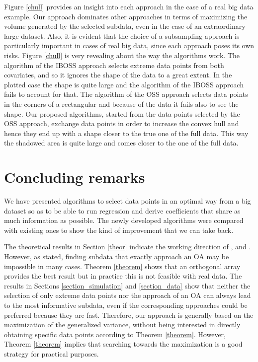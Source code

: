 \documentclass[12pt]{article}
\theoremstyle{definition}
\begin{document}
	Figure \ref{chull} provides an insight into each approach in the case of a real big data example. Our approach dominates other approaches in terms of maximizing the volume generated by the selected subdata, even in the case of an extraordinary large dataset. Also, it is evident that the choice of a subsampling approach is particularly important in cases of real big data, since each approach poses its own risks. Figure \ref{chull} is very revealing about the way the algorithms work. The algorithm of the IBOSS approach selects extreme data points from both covariates, and so it ignores the shape of the data to a great extent. In the plotted case the shape is quite large and the algorithm of the IBOSS approach fails to account for that. The algorithm of the OSS approach selects data points in the corners of a rectangular and because of the data it fails also to see the shape. Our proposed algorithms, started from the data points selected by the OSS approach, exchange data points in order to increase the convex hull and hence they end up with a shape closer to the true one of the full data. This way the shadowed area is quite large and comes closer to the one of the full data.
	
	\section{Concluding remarks}
	\label{concluding_remarks}
	We have presented algorithms to select data points in an optimal way from a big dataset so as to be able to run regression and derive coefficients that share as much information as possible. The newly developed algorithms were compared with existing ones to show the kind of improvement that we can take back. 
	
	The theoretical results in Section \ref{theor} indicate the working direction of \cite{wang2019information}, \cite{wang2021oss} and \cite{ren&zhao}. However, as \cite{wang2021oss} stated, finding subdata that exactly approach an OA may be impossible in many cases. Theorem \ref{theorem} shows that
	an orthogonal array provides the best result but in practice this is not feasible with real data. The results in Sections \ref{section_simulation} and \ref{section_data} show that neither the selection of only extreme data points nor the approach of an OA can always lead to the most informative subdata, even if the corresponding approaches could be preferred because they are fast. Therefore, our approach is generally based on the maximization of the generalized variance, without being interested in directly obtaining specific data points according to Theorem \ref{theorem}. However, Theorem \ref{theorem} implies that searching towards the maximization is a good strategy for practical purposes.  
	
\end{document}
